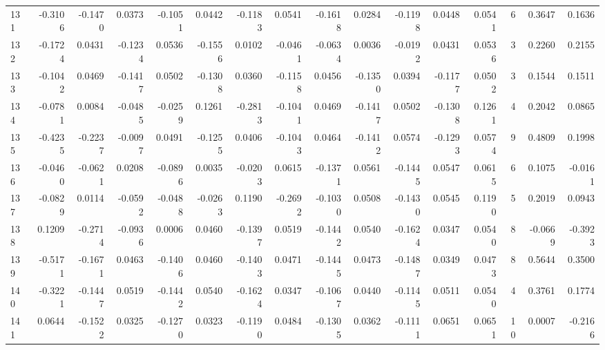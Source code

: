 \begin{tabular}{lrrrrrrrrrrrrrrr}
131 &     -0.3106 & -0.1470 &  0.0373 & -0.1051 &  0.0442 & -0.1183 &  0.0541 & -0.1618 &  0.0284 & -0.1198 &   0.0448 &     0.0541 &      6 &                    0.3647 &                     0.1636 \\
132 &     -0.1724 &  0.0431 & -0.1234 &  0.0536 & -0.1556 &  0.0102 & -0.0461 & -0.0634 &  0.0036 & -0.0192 &   0.0431 &     0.0536 &      3 &                    0.2260 &                     0.2155 \\
133 &     -0.1042 &  0.0469 & -0.1417 &  0.0502 & -0.1308 &  0.0360 & -0.1158 &  0.0456 & -0.1350 &  0.0394 &  -0.1177 &     0.0502 &      3 &                    0.1544 &                     0.1511 \\
134 &     -0.0781 &  0.0084 & -0.0485 & -0.0259 &  0.1261 & -0.2813 & -0.1041 &  0.0469 & -0.1417 &  0.0502 &  -0.1308 &     0.1261 &      4 &                    0.2042 &                     0.0865 \\
135 &     -0.4235 & -0.2237 & -0.0097 &  0.0491 & -0.1255 &  0.0406 & -0.1043 &  0.0464 & -0.1412 &  0.0574 &  -0.1293 &     0.0574 &      9 &                    0.4809 &                     0.1998 \\
136 &     -0.0460 & -0.0621 &  0.0208 & -0.0896 &  0.0035 & -0.0203 &  0.0615 & -0.1371 &  0.0561 & -0.1445 &   0.0547 &     0.0615 &      6 &                    0.1075 &                    -0.0161 \\
137 &     -0.0829 &  0.0114 & -0.0592 & -0.0488 & -0.0263 &  0.1190 & -0.2692 & -0.1030 &  0.0508 & -0.1430 &   0.0545 &     0.1190 &      5 &                    0.2019 &                     0.0943 \\
138 &      0.1209 & -0.2714 & -0.0936 &  0.0006 &  0.0460 & -0.1397 &  0.0519 & -0.1442 &  0.0540 & -0.1624 &   0.0347 &     0.0540 &      8 &                   -0.0669 &                    -0.3923 \\
139 &     -0.5171 & -0.1671 &  0.0463 & -0.1406 &  0.0460 & -0.1403 &  0.0471 & -0.1445 &  0.0473 & -0.1487 &   0.0349 &     0.0473 &      8 &                    0.5644 &                     0.3500 \\
140 &     -0.3221 & -0.1447 &  0.0519 & -0.1442 &  0.0540 & -0.1624 &  0.0347 & -0.1067 &  0.0440 & -0.1145 &   0.0511 &     0.0540 &      4 &                    0.3761 &                     0.1774 \\
141 &      0.0644 & -0.1522 &  0.0325 & -0.1270 &  0.0323 & -0.1190 &  0.0484 & -0.1305 &  0.0362 & -0.1111 &   0.0651 &     0.0651 &     10 &                    0.0007 &                    -0.2166 \\

\end{tabular}
